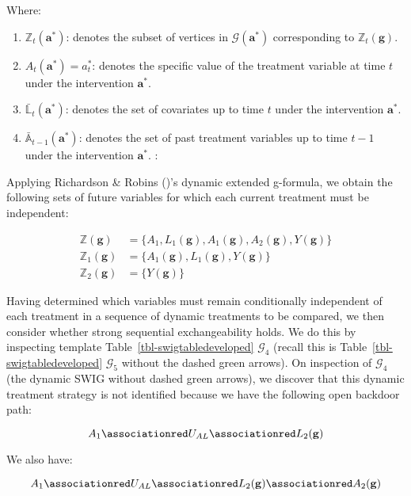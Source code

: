 \documentclass[
  single column]{article}
\providecommand{\tightlist}{%
  \setlength{\itemsep}{0pt}\setlength{\parskip}{0pt}}\usepackage{longtable,booktabs,array}
\begin{document}
Where:

\begin{enumerate}
\def\labelenumi{\arabic{enumi}.}
\tightlist
\item
  \textbf{\(\mathbb{Z}_t(\mathbf{a}^*)\)}: denotes the subset of
  vertices in \(\mathcal{G}(\mathbf{a}^*)\) corresponding to
  \(\mathbb{Z}_t(\mathbf{g})\).
\item
  \textbf{\(A_t(\mathbf{a}^*) = a^*_t\)}: denotes the specific value of
  the treatment variable at time \(t\) under the intervention
  \(\mathbf{a}^*\).
\item
  \textbf{\(\bar{\mathbb{L}}_t(\mathbf{a}^*)\)}: denotes the set of
  covariates up to time \(t\) under the intervention \(\mathbf{a}^*\).
\item
  \textbf{\(\bar{\mathbb{A}}_{t-1}(\mathbf{a}^*)\)}: denotes the set of
  past treatment variables up to time \(t-1\) under the intervention
  \(\mathbf{a}^*\). :
\end{enumerate}

Applying Richardson \& Robins ()'s
dynamic extended g-formula, we obtain the following sets of future
variables for which each current treatment must be independent:

\[
\begin{aligned}
\mathbb{Z}(\mathbf{g}) &= \{A_1, L_1(\mathbf{g}), A_1(\mathbf{g}), A_2(\mathbf{g}), Y(\mathbf{g})\} \\
\mathbb{Z}_1(\mathbf{g}) &= \{A_1(\mathbf{g}), L_1(\mathbf{g}), Y(\mathbf{g})\} \\
\mathbb{Z}_2(\mathbf{g}) &= \{Y(\mathbf{g})\}
\end{aligned}
\]

Having determined which variables must remain conditionally independent
of each treatment in a sequence of dynamic treatments to be compared, we
then consider whether strong sequential exchangeability holds. We do
this by inspecting template Table~\ref{tbl-swigtabledeveloped}
\(\mathcal{G}_4\) (recall this is Table~\ref{tbl-swigtabledeveloped}
\(\mathcal{G}_5\) without the dashed green arrows). On inspection of
\(\mathcal{G}_4\) (the dynamic SWIG without dashed green arrows), we
discover that this dynamic treatment strategy is not identified because
we have the following open backdoor path:

\[
A_1 \associationred U_{AL} \associationred L_2(\mathbf{g})
\]

We also have:

\[
A_1 \associationred U_{AL} \associationred L_2(\mathbf{g}) \associationred A_2(\mathbf{g})
\]
\end{document}
